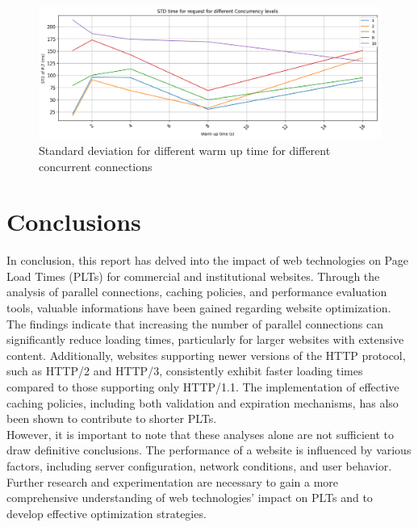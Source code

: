 \documentclass[eng]{class}
\begin{document}
\begin{figure}[H]
	\centering
	\includegraphics[width=\columnwidth]{images/var_warm_up.png}
	\caption{Standard deviation for different warm up time for different concurrent connections}
	\label{fig-8}
\end{figure}

\section{Conclusions}

In conclusion, this report has delved into the impact of web technologies on Page Load Times (PLTs) for commercial and institutional websites.
Through the analysis of parallel connections, caching policies, and performance evaluation tools, valuable informations have been gained regarding website optimization.\\
The findings indicate that increasing the number of parallel connections can significantly reduce loading times,
particularly for larger websites with extensive content. Additionally, websites supporting newer versions of the HTTP protocol,
such as HTTP/2 and HTTP/3, consistently exhibit faster loading times compared to those supporting only HTTP/1.1.
The implementation of effective caching policies, including both validation and expiration mechanisms,
has also been shown to contribute to shorter PLTs.\\
However, it is important to note that these analyses alone are not sufficient to draw definitive conclusions.
The performance of a website is influenced by various factors, including server configuration, network conditions, and user behavior.
Further research and experimentation are necessary to gain a more comprehensive understanding of web technologies'
impact on PLTs and to develop effective optimization strategies.
\end{document}

